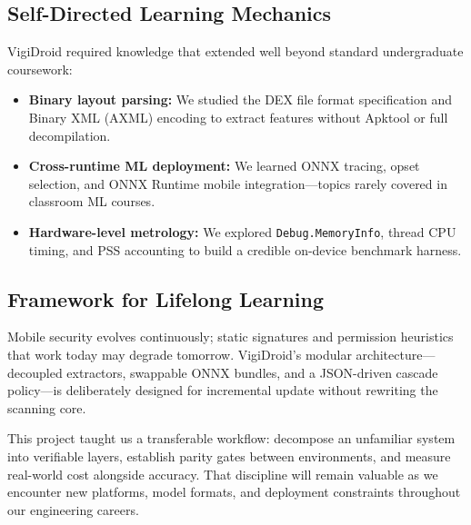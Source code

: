 \subsection{Self-Directed Learning Mechanics}
VigiDroid required knowledge that extended well beyond standard undergraduate coursework:
\begin{itemize}
 \item \textbf{Binary layout parsing:} We studied the DEX file format specification and Binary XML (AXML) encoding to extract features without Apktool or full decompilation.
 \item \textbf{Cross-runtime ML deployment:} We learned ONNX tracing, opset selection, and ONNX Runtime mobile integration---topics rarely covered in classroom ML courses.
 \item \textbf{Hardware-level metrology:} We explored \texttt{Debug.MemoryInfo}, thread CPU timing, and PSS accounting to build a credible on-device benchmark harness.
\end{itemize}

\subsection{Framework for Lifelong Learning}
Mobile security evolves continuously; static signatures and permission heuristics that work today may degrade tomorrow. VigiDroid's modular architecture---decoupled extractors, swappable ONNX bundles, and a JSON-driven cascade policy---is deliberately designed for incremental update without rewriting the scanning core.

This project taught us a transferable workflow: decompose an unfamiliar system into verifiable layers, establish parity gates between environments, and measure real-world cost alongside accuracy. That discipline will remain valuable as we encounter new platforms, model formats, and deployment constraints throughout our engineering careers.

\endinput

